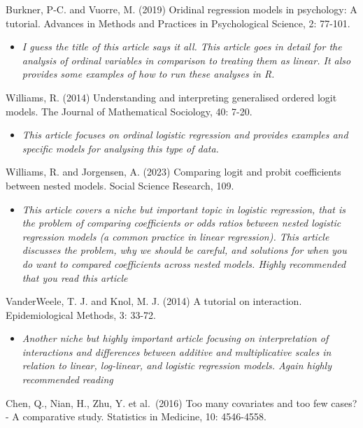 \documentclass[
]{book}
\providecommand{\tightlist}{%
  \setlength{\itemsep}{0pt}\setlength{\parskip}{0pt}}
\begin{document}
Burkner, P-C. and Vuorre, M. (2019) Oridinal regression models in psychology: A tutorial. Advances in Methods and Practices in Psychological Science, 2: 77-101.

\begin{itemize}
\tightlist
\item
  \emph{I guess the title of this article says it all. This article goes in detail for the analysis of ordinal variables in comparison to treating them as linear. It also provides some examples of how to run these analyses in R.}
\end{itemize}

Williams, R. (2014) Understanding and interpreting generalised ordered logit models. The Journal of Mathematical Sociology, 40: 7-20.

\begin{itemize}
\tightlist
\item
  \emph{This article focuses on ordinal logistic regression and provides examples and specific models for analysing this type of data.}
\end{itemize}

Williams, R. and Jorgensen, A. (2023) Comparing logit and probit coefficients between nested models. Social Science Research, 109.

\begin{itemize}
\tightlist
\item
  \emph{This article covers a niche but important topic in logistic regression, that is the problem of comparing coefficients or odds ratios between nested logistic regression models (a common practice in linear regression). This article discusses the problem, why we should be careful, and solutions for when you do want to compared coefficients across nested models. Highly recommended that you read this article}
\end{itemize}

VanderWeele, T. J. and Knol, M. J. (2014) A tutorial on interaction. Epidemiological Methods, 3: 33-72.

\begin{itemize}
\tightlist
\item
  \emph{Another niche but highly important article focusing on interpretation of interactions and differences between additive and multiplicative scales in relation to linear, log-linear, and logistic regression models. Again highly recommended reading}
\end{itemize}

Chen, Q., Nian, H., Zhu, Y. et al.~(2016) Too many covariates and too few cases? - A comparative study. Statistics in Medicine, 10: 4546-4558.
\end{document}
